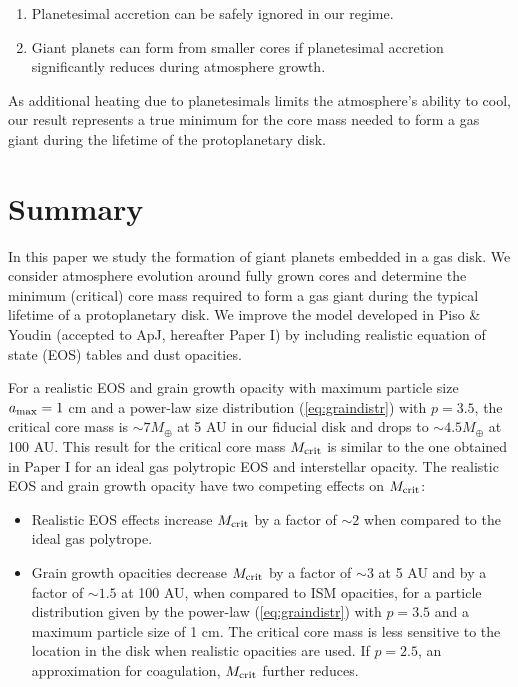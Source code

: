 \documentclass[apj]{emulateapj}
\begin{document}
\begin{enumerate}
\item Planetesimal accretion can be safely ignored in our regime.
\item Giant planets can form from smaller cores if planetesimal accretion significantly reduces during atmosphere growth. 
\end{enumerate}

As additional heating due to planetesimals limits the atmosphere's ability to cool, our result represents a true minimum for the core mass needed to form a gas giant during the lifetime of the protoplanetary disk.




 \section{Summary}
 \label{conclusions}
 
 In this paper we study the formation of giant planets embedded in a gas disk. We consider atmosphere evolution around fully grown cores and determine the minimum (critical) core mass required to form a gas giant during the typical lifetime of a protoplanetary disk. We improve the model developed in Piso \& Youdin (accepted to ApJ, hereafter Paper I) by including realistic equation of state (EOS) tables and dust opacities. 
 
 For a realistic EOS and grain growth opacity with maximum particle size $a_{\rm max}=1$ cm and a power-law size distribution (\ref{eq:graindistr}) with $p=3.5$, the critical core mass is $\sim$$7 M_{\oplus}$ at 5 AU in our fiducial disk and drops to $\sim$$4.5 M_{\oplus}$ at 100 AU. This result for the critical core mass $M_{\rm crit}$ is similar to the one obtained in Paper I for an ideal gas polytropic EOS and interstellar opacity. The realistic EOS and grain growth opacity have two competing effects on $M_{\rm crit}$:
 
 \begin{itemize}
 \item Realistic EOS effects increase $M_{\rm crit}$ by a factor of $\sim$$2$ when compared to the ideal gas polytrope.
 \item Grain growth opacities decrease $M_{\rm crit}$ by a factor of $\sim$$3$ at 5 AU and by a factor of $\sim$$1.5$ at 100 AU, when compared to ISM opacities, for a particle distribution given by the power-law (\ref{eq:graindistr}) with $p=3.5$ and a maximum particle size of 1 cm. The critical core mass is less sensitive to the location in the disk when realistic opacities are used. If $p=2.5$, an approximation for coagulation,  $M_{\rm crit}$ further reduces. 
 \end{itemize}
 
\end{document}
